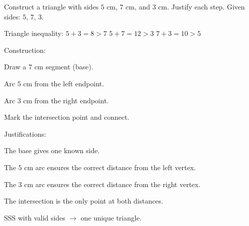 \begin{stepExample}{Construct a triangle with sides $5$ cm, $7$ cm, and $3$ cm. Justify each step.}
     Given sides: $5$, $7$, $3$.

     Triangle inequality: $5 + 3 = 8 > 7$ \checkmark \quad $5 + 7 = 12 > 3$ \checkmark \quad $7 + 3 = 10 > 5$ \checkmark

     Construction:\par
    Draw a $7$ cm segment (base).\par
    Arc $5$ cm from the left endpoint.\par
    Arc $3$ cm from the right endpoint.\par
    Mark the intersection point and connect.

     Justifications:\par
    The base gives one known side.\par
    The $5$ cm arc ensures the correct distance from the left vertex.\par
    The $3$ cm arc ensures the correct distance from the right vertex.\par
    The intersection is the only point at both distances.

     SSS with valid sides $\to$ one unique triangle.
\end{stepExample}


